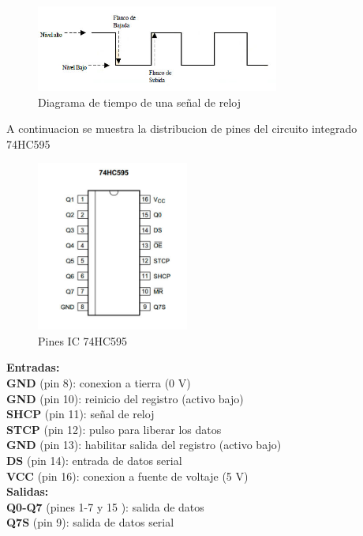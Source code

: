 \documentclass{article}
\begin{document}
\begin{figure}[!ht]
\includegraphics[width=8cm]{flanco1.jpg}
\centering
\caption{Diagrama de tiempo de una señal de reloj}
\end{figure}

A continuacion se muestra la distribucion de pines del circuito integrado 74HC595\\

\begin{figure}[!ht]
\includegraphics[width=5cm]{74HC595.jpg}
\centering
\caption{Pines IC 74HC595}
\end{figure}

\noindent\textbf{Entradas:}\\
\indent \textbf{GND} (pin 8): conexion a tierra (0 V)\\
\indent \textbf{GND} (pin 10): reinicio del registro (activo bajo)\\
\indent \textbf{SHCP} (pin 11): señal de reloj \\
\indent \textbf{STCP} (pin 12): pulso para liberar los datos \\
\indent \textbf{GND} (pin 13): habilitar salida del registro (activo bajo)\\
\indent \textbf{DS} (pin 14): entrada de datos serial \\
\indent \textbf{VCC} (pin 16): conexion a fuente de voltaje (5 V)\\

\noindent\textbf{Salidas:}\\ 
\indent \textbf{Q0-Q7} (pines 1-7 y 15 ): salida de datos\\
\indent \textbf{Q7S} (pin 9): salida de datos serial\\
\end{document}
